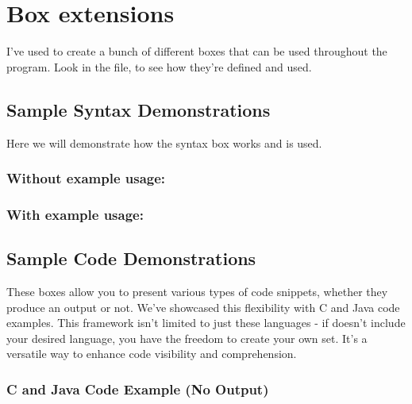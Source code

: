 \section{Box extensions}

I've used  to create a bunch of different boxes that can be used throughout the program. Look in the  file, to see how they're defined and used.


\subsection{Sample Syntax Demonstrations}
Here we will demonstrate how the syntax box works and is used. 

\subsubsection*{Without example usage:}



\subsubsection*{With example usage:}




\subsection{Sample Code Demonstrations}
These boxes allow you to present various types of code snippets, whether they produce an output or not. We've showcased this flexibility with C and Java code examples. This framework isn't limited to just these languages - if  doesn't include your desired language, you have the freedom to create your own set. It's a versatile way to enhance code visibility and comprehension.

\subsubsection{C and Java Code Example (No Output)}

